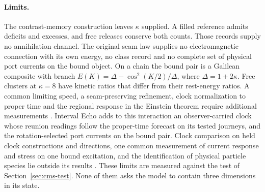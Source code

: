 \paragraph{Limits.}
The contrast-memory construction leaves $\kappa$ supplied. A filled
reference admits deficits and excesses, and free releases conserve both
counts. Those records supply no annihilation channel. The original seam law
supplies no electromagnetic connection with its own energy, no class
record and no complete set of physical port currents on the bound object.
On a chain the bound pair is a Galilean composite with branch
$E(K)=\Delta-\cos^2(K/2)/\Delta$, where $\Delta=1+2\kappa$. Free
clusters at $\kappa=8$ have kinetic ratios that differ from their
rest-energy ratios. A common limiting speed, a seam-preserving
refinement, clock normalization to proper time and the regional response
in the Einstein theorem require additional measurements
\cite{ophEinstein}. Interval Echo adds to this interaction an
observer-carried clock whose reunion readings follow the proper-time forecast on its
tested journeys, and the rotation-selected port currents on the bound pair. Clock
comparison on held clock constructions and directions, one common measurement of current
response and stress on one bound excitation, and the identification of physical particle
species lie outside its results \cite{ophmodel}. These limits are measured against the test of
Section~\ref{sec:cms-test}. None of them asks the model to contain three dimensions in its
state.
